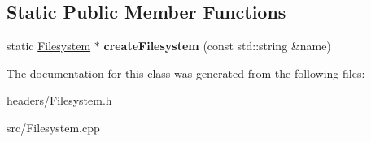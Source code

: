 \subsection*{Static Public Member Functions}
\begin{DoxyCompactItemize}
\item 
\hypertarget{class_filesystem_a225c02ba382d5bd91bc1cb0180d12ef7}{}\label{class_filesystem_a225c02ba382d5bd91bc1cb0180d12ef7} 
static \hyperlink{class_filesystem}{Filesystem} $\ast$ {\bfseries create\+Filesystem} (const std\+::string \&name)
\end{DoxyCompactItemize}


The documentation for this class was generated from the following files\+:\begin{DoxyCompactItemize}
\item 
headers/Filesystem.\+h\item 
src/Filesystem.\+cpp\end{DoxyCompactItemize}
